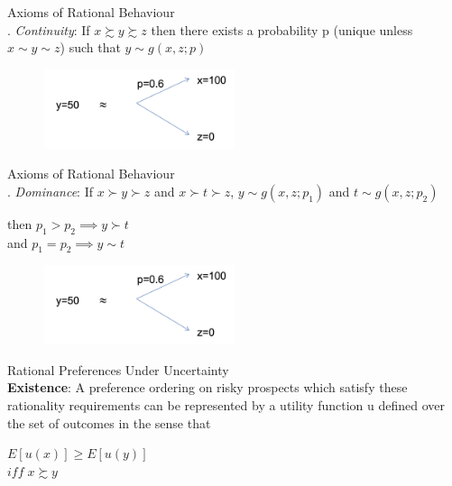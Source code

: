 \documentclass[
14pt,notheorems,hyperref={pdfauthor=whatever}
]{beamer}
\begin{document}
\begin{frame}
Axioms of Rational Behaviour\\
\hfill {}. \textit{Continuity}: If $x \succsim y \succsim z$ then there exists a probability p (unique unless $x \sim y \sim z$) such that $y \sim g(x,z;p)$\\
\begin{figure}[ut4]
    \includegraphics[width=0.5\textwidth]{L1UT4}
    \centering
\end{figure}
\end{frame}

\begin{frame}
Axioms of Rational Behaviour\\
\hfill {}. \textit{Dominance}: If $x \succ y \succ z$ and $x \succ t \succ z$, $y \sim g(x,z;p_1)$ and $t \sim g(x,z;p_2)$\\
\begin{center}
    then $p_1 > p_2 \implies y \succ t$\\
    and $p_1 = p_2 \implies y \sim t$\\
\end{center}
\begin{figure}[ut4]
    \includegraphics[width=0.5\textwidth]{L1UT4}
    \centering
\end{figure}
\end{frame}

\begin{frame}
Rational Preferences Under Uncertainty\\
\hfill \break
\textbf{Existence}: A preference ordering on risky prospects which satisfy these rationality requirements can be represented by a utility function u defined over the set of outcomes in the sense that\\
\hfill \break
\begin{center}
    $E[u(x)] \geq E[u(y)]$\\
    $iff\;x \succsim y$\\
\end{center}
\end{frame}
\end{document}
